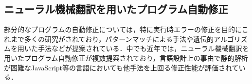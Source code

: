 \documentclass[submit,ses,noauthor]{ipsj}
\newcommand{\listingcaption}[1]{
\refstepcounter{lstlisting}
\smallskip
\centerline{
Listing \thelstlisting\quad#1
\vspace{-1mm}
}}
\begin{document}
%
%
%
%
%
%
%
%







\subsection{ニューラル機械翻訳を用いたプログラム自動修正}

部分的なプログラムの自動修正については，特に実行時エラーの修正を目的にこれまで多くの研究がされており，パターンマッチによる手法や遺伝的アルゴリズムを用いた手法などが提案されている．中でも近年では，ニューラル機械翻訳を用いたプログラム自動修正が複数提案されており\cite{chen_2018}\cite{lutellier_2020}，言語設計上の事由で静的解析が困難なJavaScript等の言語においても他手法を上回る修正性能が評価されている\cite{lutellier_2020}．
\end{document}

